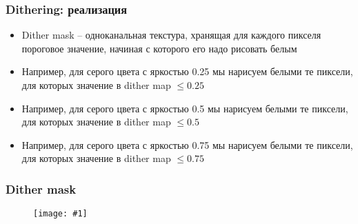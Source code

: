 \documentclass{beamer}
\newcommand{\slideimage}[1]{
  \begin{figure}
    \begin{adjustbox}{width=\textwidth, totalheight=\textheight-2\baselineskip-2\baselineskip,keepaspectratio}
      \texttt{[image: \#1]}
    \end{adjustbox}
  \end{figure}
}
\begin{document}

\begin{frame}[fragile]
\frametitle{Dithering: реализация}
\begin{itemize}
\item Dither mask -- одноканальная текстура, хранящая для каждого пикселя пороговое значение, начиная с которого его надо рисовать белым
\pause
\item Например, для серого цвета с яркостью 0.25 мы нарисуем белыми те пиксели, для которых значение в dither map \begin{math}\leq 0.25\end{math}
\pause
\item Например, для серого цвета с яркостью 0.5 мы нарисуем белыми те пиксели, для которых значение в dither map \begin{math}\leq 0.5\end{math}
\pause
\item Например, для серого цвета с яркостью 0.75 мы нарисуем белыми те пиксели, для которых значение в dither map \begin{math}\leq 0.75\end{math}
\end{itemize}
\end{frame}

\begin{frame}[fragile]
\frametitle{Dither mask}
\slideimage{dither-mask.png}
\end{frame}
\end{document}
